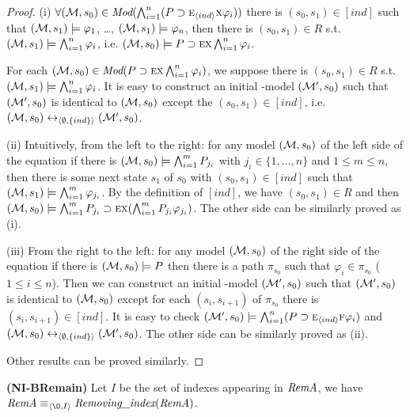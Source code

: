\documentclass{article}
\begin{document}
\begin{proof}
(i) $\forall ({\cal M}, s_0) \in \textit{Mod}(\bigwedge_{i=1}^n (P\supset \textsc{e}_{{\langle{ind}\rangle}} \textsc{x} \varphi_i))$ there is $(s_0, s_1)\in [ind]$ such that $({\cal M}, s_1) \models \varphi_1$, \dots, $({\cal M}, s_1) \models \varphi_n$, then there is $(s_0, s_1)\in R$ s.t. $({\cal M}, s_1) \models \bigwedge_{i=1}^n \varphi_i$, i.e. $({\cal M}, s_0) \models P\supset \textsc{e} \textsc{x} \bigwedge_{i=1}^n \varphi_i$.

For each $({\cal M}, s_0) \in \textit{Mod}(P\supset \textsc{e} \textsc{x} \bigwedge_{i=1}^n \varphi_i)$, we suppose there is $(s_0, s_1)\in R$ s.t. $({\cal M}, s_1) \models \bigwedge_{i=1}^n \varphi_i$. It is easy to construct an initial \Ind-model $({\cal M}', s_0)$ such that $({\cal M}', s_0)$ is identical to $({\cal M}, s_0)$ except the $(s_0, s_1) \in [ind]$, i.e. $({\cal M}, s_0) \leftrightarrow_{{\langle{\emptyset, \{ind\}}\rangle}} ({\cal M}', s_0)$.

(ii) Intuitively, from the left to the right: for any model $({\cal M},s_0)$ of the left side of the equation if there is $({\cal M},s_0) \models \bigwedge_{i=1}^m P_{j_i}$ with $j_i \in \{1, \dots, n\}$ and $1\leq m \leq n$, then there is some next state $s_1$ of $s_0$ with $(s_0, s_1) \in [ind]$ such that $({\cal M}, s_1) \models \bigwedge_{i=1}^m \varphi_{j_i}$. By the definition of $[ind]$, we have $(s_0, s_1) \in R$ and then $({\cal M}, s_0) \models \bigwedge_{i=1}^m P_{j_i} \supset \textsc{e} \textsc{x} (\bigwedge_{i=1}^m P_{j_i} \varphi_{j_i})$. The other side can be similarly proved as (i).

(iii) From the right to the left:  for any model $({\cal M},s_0)$ of the right side of the equation if there is $({\cal M},s_0) \models P$ then there is a path $\pi_{s_0}$ such that $\varphi_i \in \pi_{s_0}$ ($1\leq i \leq n$). Then we can construct an initial \Ind-model $({\cal M}', s_0)$ such that $({\cal M}', s_0)$ is identical to $({\cal M}, s_0)$ except for each $(s_i, s_{i+1})$ of $\pi_{s_0}$ there is $(s_i, s_{i+1}) \in [ind]$. It is easy to check $({\cal M}', s_0) \models \bigwedge_{i=1}^n (P\supset \textsc{e}_{{\langle{ind}\rangle}} \textsc{f} \varphi_i)$ and  $({\cal M}, s_0) \leftrightarrow_{{\langle{\emptyset, \{ind\}}\rangle}} ({\cal M}', s_0)$.  The other side can be similarly proved as (ii).

Other results can be proved similarly.
\end{proof}


\begin{proposition}\label{lem:No:Ind}
\textbf{(NI-BRemain)}
Let $I$ be the set of indexes appearing in $\emph{RemA}$,
we have $\emph{RemA}\equiv_{\tuple{{\O}, I}} \emph{Removing\_index}(\emph{RemA})$.
\end{proposition}
\end{document}
